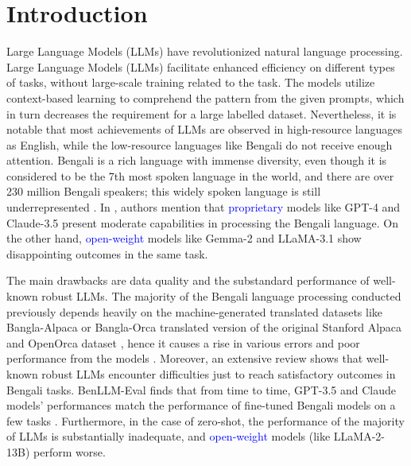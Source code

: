 \documentclass[10pt,letterpaper]{article}
\newcommand{\rev}[1]{\textcolor{blue}{#1}}
\begin{document}

\linenumbers

\section*{Introduction}
Large Language Models (LLMs) have revolutionized natural language processing. Large Language Models (LLMs) facilitate enhanced efficiency on different types of tasks, without large-scale training related to the task. The models utilize context-based learning to comprehend the pattern from the given prompts, which in turn decreases the requirement for a large labelled dataset. Nevertheless, it is notable that most achievements of LLMs are observed in high-resource languages as English, while the low-resource languages like Bengali do not receive enough attention. Bengali is a rich language with immense diversity, even though it is considered to be the 7th most spoken language in the world, and there are over 230 million Bengali speakers; this widely spoken language is still underrepresented \cite{b45}. In \cite{b10,b29}, authors mention that \rev{proprietary} models like GPT-4 and Claude-3.5 present moderate capabilities in processing the Bengali language. On the other hand, \rev{open-weight} models like Gemma-2 and LLaMA-3.1 show disappointing outcomes in the same task.

The main drawbacks are data quality and the substandard performance of well-known robust LLMs. The majority of the Bengali language processing conducted previously depends heavily on the machine-generated translated datasets like Bangla-Alpaca or Bangla-Orca translated version of the original Stanford Alpaca and OpenOrca dataset \cite{b48}, hence it causes a rise in various errors and poor performance from the models \cite{b28}. Moreover, an extensive review shows that well-known robust LLMs encounter difficulties just to reach satisfactory outcomes in Bengali tasks. BenLLM-Eval finds that from time to time, GPT-3.5 and Claude models’ performances match the performance of fine-tuned Bengali models on a few tasks \cite{b3}. Furthermore, in the case of zero-shot, the performance of the majority of LLMs is substantially inadequate, and \rev{open-weight} models (like LLaMA-2-13B) perform worse.
\end{document}
